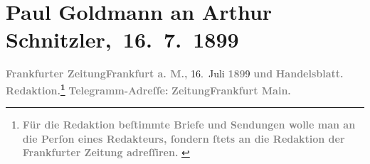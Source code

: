 

         
         \renewcommand{\erwaehntePersonen}{Personen: Richard Beer-Hofmann, Paul Goldmann, Hermann Hettner, Fedor Mamroth}
         \renewcommand{\erwaehnteInstitutionen}{Institutionen: Frankfurter Zeitung, Friedrich Vieweg und Sohn}
         \renewcommand{\erwaehnteOrte}{Orte: Bayreuth, Braunschweig, Florenz, Frankfurt am Main, Italien, Rennes, Rom, Slawonien, Velden am Wörthersee, Wien}
         \renewcommand{\erwaehnteWerke}{Werke: Ein Sommer in China. Reisebilder, Geschichte der französischen Literatur im achtzehnten Jahrhundert}
               \section[ Paul Goldmann an Arthur Schnitzler, 16. 7. 1899]{ Paul Goldmann an Arthur Schnitzler, 16. 7. 1899}\nopagebreak{}\rehead{ }\begin{ledgroupsized}[t]{13cm}\normalsize\beginnumbering \toendnotes[C]{\smallbreak\pagebreak[2]} 
\toendnotes[C]{\smallbreak}\pstart
           \noindent{}{\pb}\textcolor{gray}{\textbf{\textbf{Frankfurter Zeitung}}}\hfill \textcolor{gray}{\textbf{\textbf{Frankfurt a. M.,}}}{ }16. Juli \textcolor{gray}{\textbf{189}}9\pend
           \pstart
           \textcolor{gray}{\textbf{und}}\pend
           \pstart
           \textcolor{gray}{\textbf{Handelsblatt.}}\pend
           \pstart
           \textcolor{gray}{\textbf{\textbf{Redaktion.}\footnote{\noindent{}\textcolor{gray}{\textbf{Für die Redaktion beſtimmte Briefe und Sendungen wolle man
                                  an die Perſon eines Redakteurs,
                              ſondern ſtets \textbf{an die Redaktion der Frankfurter Zeitung} adreſſiren. }}}}}\pend
           \pstart
           \textcolor{gray}{\textbf{Telegramm-Adreſſe:}}\pend
           \pstart
           \textcolor{gray}{\textbf{\textbf{ZeitungFrankfurt Main.}}}\pend

\end{ledgroupsized}
